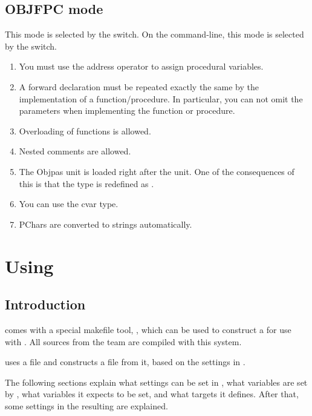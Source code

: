 {\section{OBJFPC mode}
This mode is selected by the  switch. On the command-line,
this mode is selected by the  switch.
\begin{enumerate}
\item You must use the address operator to assign procedural variables.
\item A forward declaration must be repeated exactly the same by the
implementation of a function/procedure. In particular, you can not omit the
parameters when implementing the function or procedure.
\item Overloading of functions is allowed.
\item Nested comments are allowed.
\item The Objpas unit is loaded right after the  unit. One of the
consequences of this is that the type  is redefined as
.
\item You can use the cvar type.
\item PChars are converted to strings automatically.
\end{enumerate}


\chapter{Using }
\label{ch:makefile}
\newcommand{\mvar}[1]{\var{\$(#1)}}
\newcommand{\fpcmake}{\file{fpcmake}}
\section{Introduction}
\fpc comes with a special makefile tool, \fpcmake{}, which can be
used to construct a  for use with \gnu {}.
All sources from the \fpc team are compiled with this system.

\fpcmake{} uses a file  and constructs a file
 from it, based on the settings in .

The following sections explain what settings can be set in ,
what variables are set by , what variables it expects to be set,
and what targets it defines. After that, some settings in the resulting
 are explained.

}
